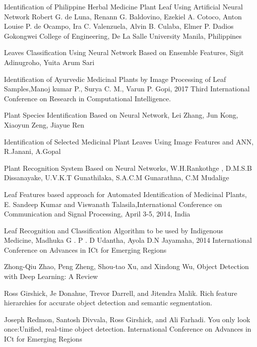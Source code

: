 
\clearpage
{}
\begin{thebibliography}{99}

Identification of Philippine Herbal Medicine Plant Leaf Using Artificial Neural Network Robert G. de Luna, Renann G. Baldovino, Ezekiel A. Cotoco, Anton Louise P. de Ocampo, Ira C. Valenzuela, Alvin B. Culaba, Elmer P. Dadios Gokongwei College of Engineering, De La Salle University Manila, Philippines

Leaves Classification Using Neural Network Based on Ensemble Features, Sigit Adinugroho, Yuita Arum Sari

Identification of Ayurvedic Medicinal Plants by Image Processing of Leaf Samples,Manoj kumar P., Surya C. M., Varun P. Gopi, 2017 Third International Conference on Research in Computational Intelligence.

Plant Species Identification Based on Neural Network, Lei Zhang, Jun Kong, Xiaoyun Zeng, Jiayue Ren

Identification of Selected Medicinal Plant Leaves Using Image Features and ANN, R.Janani, A.Gopal

Plant Recognition System Based on Neural Networks, W.H.Rankothge , D.M.S.B Dissanayake, U.V.K.T Gunathilaka, S.A.C.M Gunarathna, C.M Mudalige

Leaf Features based approach for Automated Identification of Medicinal Plants, E. Sandeep Kumar and Viswanath Talasila,International Conference on Communication and Signal Processing, April 3-5, 2014, India

Leaf Recognition and Classification Algorithm to be used by Indigenous Medicine, Madhuka G . P . D Udantha, Ayola D.N Jayamaha, 2014 International Conference on Advances in ICt for Emerging Regions

Zhong-Qiu Zhao, Peng Zheng, Shou-tao Xu, and Xindong Wu, Object Detection with Deep Learning: A Review

Ross Girshick, Je Donahue, Trevor Darrell, and Jitendra Malik. Rich feature hierarchies for accurate object detection and semantic segmentation.

Joseph Redmon, Santosh Divvala, Ross Girshick, and Ali Farhadi. You only look once:Unified, real-time object detection. International Conference on Advances in ICt for Emerging Regions


\end{thebibliography}
